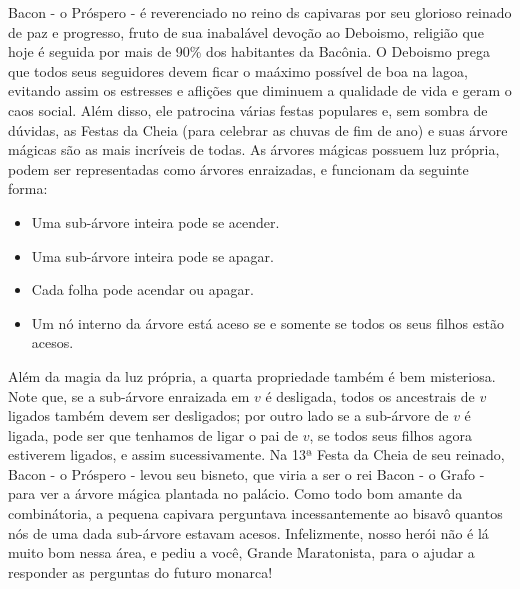 %

Bacon - o Próspero - é reverenciado no reino ds capivaras por seu glorioso reinado de paz e progresso, fruto de sua inabalável devoção ao Deboismo,
religião que hoje é seguida por mais de 90\% dos habitantes da Bacônia. O Deboismo prega que todos seus seguidores devem ficar o maáximo possível
de boa na lagoa, evitando assim os estresses e aflições que diminuem a qualidade de vida e geram o caos social. Além disso, ele patrocina várias festas
populares e, sem sombra de dúvidas, as Festas da Cheia (para celebrar as chuvas de fim de ano) e suas árvore mágicas são as mais incríveis de todas.
As árvores mágicas possuem luz própria, podem ser representadas como árvores enraizadas, e funcionam da seguinte forma:

\begin{itemize}
	\item Uma sub-árvore inteira pode se acender.
	\item Uma sub-árvore inteira pode se apagar.
	\item Cada folha pode acendar ou apagar.
	\item Um nó interno da árvore está aceso se e somente se todos os seus filhos estão acesos.
\end{itemize}

Além da magia da luz própria, a quarta propriedade também é bem misteriosa. Note que, se a sub-árvore enraizada em $v$ é desligada,
todos os ancestrais de $v$ ligados também devem ser desligados; por outro lado se a sub-árvore de $v$ é ligada, pode ser que tenhamos de ligar o pai de $v$,
se todos seus filhos agora estiverem ligados, e assim sucessivamente.
Na 13ª Festa da Cheia de seu reinado, Bacon - o Próspero - levou seu bisneto, que viria a ser o rei Bacon - o Grafo - para ver a árvore mágica plantada
no palácio. Como todo bom amante da combinátoria, a pequena capivara perguntava incessantemente ao bisavô quantos nós de uma dada sub-árvore estavam acesos.
Infelizmente,  nosso herói não é lá muito bom nessa área, e pediu a você, Grande Maratonista, para o ajudar a responder as perguntas do futuro monarca!

%
%

